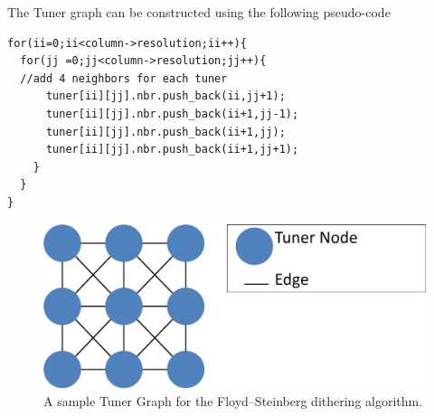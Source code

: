 \documentclass[annual]{acmsiggraph}
\begin{document}
The Tuner graph can be constructed using the following pseudo-code
\begin{verbatim}
for(ii=0;ii<column->resolution;ii++){
  for(jj =0;jj<column->resolution;jj++){
  //add 4 neighbors for each tuner
      tuner[ii][jj].nbr.push_back(ii,jj+1);
      tuner[ii][jj].nbr.push_back(ii+1,jj-1);
      tuner[ii][jj].nbr.push_back(ii+1,jj);
      tuner[ii][jj].nbr.push_back(ii+1,jj+1);    
    }
  }
}
\end{verbatim}

\begin{figure}[h]
\includegraphics[scale=0.3]{figure/tuner.pdf}
\caption{A sample Tuner Graph for the Floyd–Steinberg dithering algorithm.}
\label{fig:tuner}
\end{figure}
\end{document}

